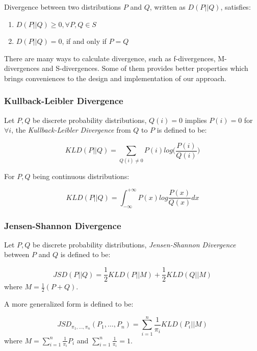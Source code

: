 \documentclass[a4paper]{IEEEtran}
\begin{document}
		Divergence between two distributions $P$ and $Q$, written as $D(P||Q)$, satisfies:
		
		\begin{enumerate}
			\item $D(P||Q) \ge 0, \forall P, Q \in S$
			\item $D(P||Q) = 0$, if and only if $P=Q$
		\end{enumerate}
		
		There are many ways to calculate divergence, such as f-divergences, M-divergences and S-divergences. Some of them provides better properties which brings conveniences to the design and implementation of our approach.
		
		\subsubsection{Kullback-Leibler Divergence}
		Let $P,Q$ be discrete probability distributions, $Q(i)=0$ implies $P(i)=0$ for $\forall i$, the \textit{Kullback-Leibler Divergence} from $Q$ to $P$ is defined to be:
		
		\begin{equation}
		KLD(P||Q) = \sum_{Q(i)\ne 0} P(i)log\Big(\frac{P(i)}{Q(i)}\Big)
		\end{equation}
		
		For $P,Q$ being continuous distributions:
		
		\begin{equation}
			KLD(P||Q) = \int_{-\infty}^{+\infty} P(x)log\frac{P(x)}{Q(x)}dx
		\end{equation}
		
		\subsubsection{Jensen-Shannon Divergence}
		Let $P,Q$ be discrete probability distributions, \textit{Jensen-Shannon Divergence} between $P$ and $Q$ is defined to be:
		
		\begin{equation}
		JSD(P||Q) = \frac{1}{2}KLD(P||M) + \frac{1}{2}KLD(Q||M)
		\end{equation}
		where $\displaystyle M = \frac{1}{2}(P+Q)$.
		
		A more generalized form is defined to be:
		
		\begin{equation}
		JSD_{\pi_1, \dots, \pi_n}(P_1, \dots, P_n) = \sum_{i=1}^{n}\frac{1}{\pi_i}KLD(P_i||M)
		\end{equation}
		where $\displaystyle M = \sum_{i=1}^{n}\frac{1}{\pi_i}P_i$ and $\displaystyle \sum_{i=1}^{n}\frac{1}{\pi_i} = 1$.
		
\end{document}
